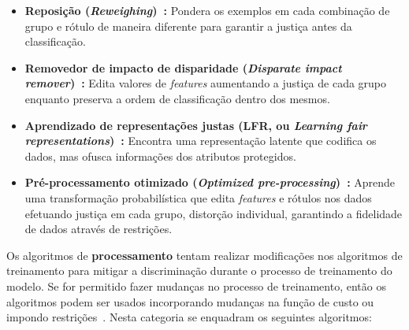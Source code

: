 \documentclass[portugues]{ic-tese}
\begin{document}
\begin{itemize}
\item \textbf{Reposição (\textit{Reweighing})~\citep{Kamiran_2011}:} Pondera os exemplos em cada combinação de grupo e rótulo de maneira diferente para garantir a justiça antes da classificação.

\item \textbf{Removedor de impacto de disparidade (\textit{Disparate impact remover})~\citep{Feldman_2015}:} Edita valores de \textit{features} aumentando a justiça de cada grupo enquanto preserva a ordem de classificação dentro dos mesmos.

\item \textbf{Aprendizado de representações justas (LFR, ou \textit{Learning fair representations})~\citep{Zemel_2013}:} Encontra uma representação latente que codifica os dados, mas ofusca informações dos atributos protegidos.

\item \textbf{Pré-processamento otimizado (\textit{Optimized pre-processing})~\citep{Calmon_2017}:} Aprende uma transformação probabilística que edita \textit{features} e rótulos nos dados efetuando justiça em cada grupo, distorção individual, garantindo a fidelidade de dados através de restrições.
\end{itemize}

Os algoritmos de \textbf{processamento} tentam realizar modificações nos algoritmos de treinamento para mitigar a discriminação durante o processo de treinamento do modelo. Se for permitido fazer mudanças no processo de treinamento, então os algoritmos podem ser usados incorporando mudanças na função de custo ou impondo restrições~\citep{Mehrabi_2021}. Nesta categoria se enquadram os seguintes algoritmos:
\end{document}
